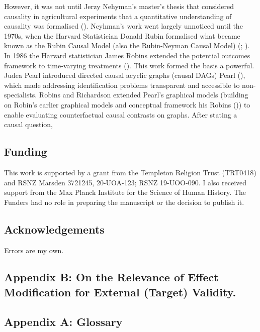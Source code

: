 \documentclass[
  single column]{article}
\begin{document}
However, it was not until Jerzy Nehyman's master's thesis that
considered causality in agricultural experiments that a quantitative
understanding of causality was formalised
(). Neyhman's
work went largely unnoticed until the 1970s, when the Harvard
Statistician Donald Rubin formalised what became known as the Rubin
Causal Model (also the Rubin-Neyman Causal Model)
(;
). In 1986 the Harvard statistician
James Robins extended the potential outcomes framework to time-varying
treatments (). This work formed
the basis a powerful. Judea Pearl introduced directed causal acyclic
graphs (causal DAGs) Pearl (), which made
addressing identification problems transparent and accessible to
non-specialists. Robins and Richardson extended Pearl's graphical models
(building on Robin's earlier graphical models and conceptual framework
his Robins ()) to enable evaluating
counterfactual causal contrasts on graphs. After stating a causal
question,

\subsection{Funding}\label{funding}

This work is supported by a grant from the Templeton Religion Trust
(TRT0418) and RSNZ Marsden 3721245, 20-UOA-123; RSNZ 19-UOO-090. I also
received support from the Max Planck Institute for the Science of Human
History. The Funders had no role in preparing the manuscript or the
decision to publish it.

\subsection{Acknowledgements}\label{acknowledgements}

Errors are my own.

\subsection{Appendix B: On the Relevance of Effect Modification for
External (Target)
Validity.}\label{appendix-b-on-the-relevance-of-effect-modification-for-external-target-validity.}

\subsection{Appendix A: Glossary}\label{appendix-a-glossary}
\end{document}
